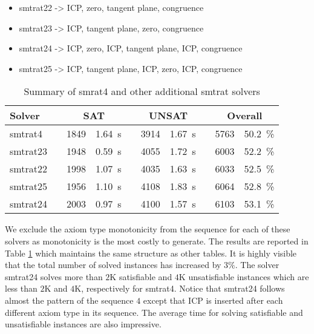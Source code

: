 \begin{itemize}
    \item smtrat22 -> ICP, zero, tangent plane, congruence
    \item smtrat23 -> ICP, tangent plane, zero, congruence
    \item smtrat24 -> ICP, zero, ICP, tangent plane, ICP, congruence
    \item smtrat25 -> ICP, tangent plane, ICP, zero, ICP, congruence
\end{itemize}

\begin{table}[h]
\caption{Summary of smrat4 and other additional smtrat solvers}
\begin{tabularx}{\textwidth}{lXrrXrrXrr}
	\toprule
	\textbf{Solver}
	&& \multicolumn{2}{c}{\textbf{SAT}}
	&& \multicolumn{2}{c}{\textbf{UNSAT}}
	&& \multicolumn{2}{c}{\textbf{Overall}}
	\\
	\midrule
	smtrat4
	&& 1849 & 1.64~s
	&& 3914 & 1.67~s
	&& 5763 & 50.2~\%
	\\
	smtrat23
	&& 1948 & 0.59~s
	&& 4055 & 1.72~s
	&& 6003 & 52.2~\%
	\\
	smtrat22
	&& 1998 & 1.07~s
	&& 4035 & 1.63~s
	&& 6033 & 52.5~\%
	\\
	smtrat25
	&& 1956 & 1.10~s
	&& 4108 & 1.83~s
	&& 6064 & 52.8~\%
	\\
	smtrat24
	&& 2003 & 0.97~s
	&& 4100 & 1.57~s
	&& 6103 & 53.1~\%
	\\
	\bottomrule
\end{tabularx}
\label{table:Summary_of_smrat4_and_other_additional_smtrat_solvers}
\end{table}

\noindent We exclude the axiom type monotonicity from the sequence for each of these solvers as monotonicity is the most costly to generate.
The results are reported in Table \ref{table:Summary_of_smrat4_and_other_additional_smtrat_solvers} which maintains the same structure as other tables.
It is highly visible that the total number of solved instances has increased by $3\%$.
The solver smtrat24 solves more than $2$K satisfiable and $4$K unsatisfiable instances  which are less than $2$K and $4$K, respectively for smtrat4.
Notice that smtrat24 follows almost the pattern of the sequence $4$ except that ICP is inserted after each different axiom type in its sequence.
The average time for solving satisfiable and unsatisfiable instances are also impressive.
\newline

